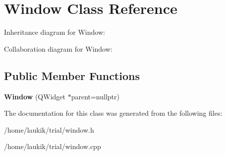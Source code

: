 \hypertarget{classWindow}{}\section{Window Class Reference}
\label{classWindow}


Inheritance diagram for Window\+:


Collaboration diagram for Window\+:
\subsection*{Public Member Functions}
\begin{DoxyCompactItemize}
\item 
\mbox{\label{classWindow_a8c86e48ef3180201cc97cb928abd66ca}} 
{\bfseries Window} (Q\+Widget $\ast$parent=nullptr)
\end{DoxyCompactItemize}


The documentation for this class was generated from the following files\+:\begin{DoxyCompactItemize}
\item 
/home/laukik/trial/window.\+h\item 
/home/laukik/trial/window.\+cpp\end{DoxyCompactItemize}
